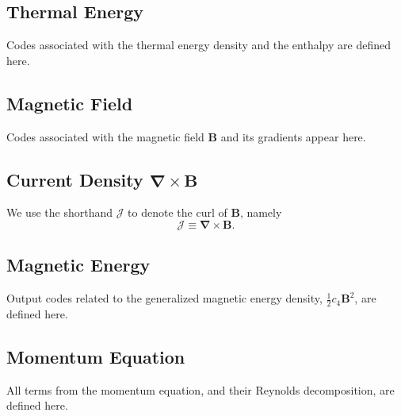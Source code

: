 \documentclass[10pt,letterpaper]{article}
\begin{document}
\subsection{Thermal Energy}
Codes associated with the thermal energy density and the enthalpy are defined here. 




\subsection{Magnetic Field}
Codes associated with the magnetic field $\boldsymbol{B}$ and its gradients appear here.





\subsection{Current Density $\boldsymbol{\nabla}\times\boldsymbol{B}$}
We use the shorthand $\boldsymbol{\mathcal{J}}$ to denote the curl of $\boldsymbol{B}$, namely
\begin{equation}
\boldsymbol{\mathcal{J}}\equiv\boldsymbol{\nabla}\times\boldsymbol{B}.
\end{equation}





\subsection{Magnetic Energy}
Output codes related to the generalized magnetic energy density, $\frac{1}{2}c_4\boldsymbol{B}^2$, are defined here.




\subsection{Momentum Equation}
All terms from the momentum equation, and their Reynolds decomposition, are defined here.



\end{document}
